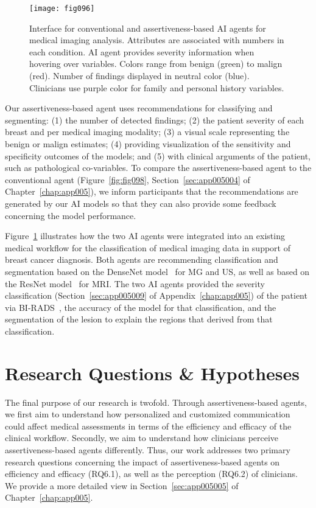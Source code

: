 \begin{figure}[htpb]
\centering
\texttt{[image: fig096]}
\caption[]{Interface for conventional and assertiveness-based AI agents for medical imaging analysis. Attributes are associated with numbers in each condition. AI agent provides severity information when hovering over variables. Colors range from benign (green) to malign (red). Number of findings displayed in neutral color (blue). Clinicians use purple color for family and personal history variables.}
\label{fig:fig096}
\end{figure}

Our assertiveness-based agent uses recommendations for classifying and segmenting:
(1) the number of detected findings;
(2) the patient severity of each breast and per medical imaging modality;
(3) a visual scale representing the benign or malign estimates;
(4) providing visualization of the sensitivity and specificity outcomes of the models; and
(5) with clinical arguments of the patient, such as pathological co-variables.
To compare the assertiveness-based agent to the conventional agent \textcolor{revised}{(Figure~\ref{fig:fig098}, Section~\ref{sec:app005004} of Chapter~\ref{chap:app005})}, we inform participants that the recommendations are generated by our \ac{AI} models so that they can also provide some feedback concerning the model performance.

Figure~\ref{fig:fig096} illustrates how the two \ac{AI} agents were integrated into an existing medical workflow for the classification of medical imaging data in support of breast cancer diagnosis.
Both agents are recommending classification and segmentation based on the DenseNet model~\cite{8721151} for \ac{MG} and \ac{US}, as well as based on the ResNet model~\cite{10.1145/3544548.3580682} for \ac{MRI}.
The two \ac{AI} agents provided the severity classification (Section~\ref{sec:app005009} of Appendix~\ref{chap:app005}) of the patient via \ac{BI-RADS}~\cite{SPAK2017179}, the accuracy of the model for that classification, and the segmentation of the lesion to explain the regions that derived from that classification.

\section{Research Questions \& Hypotheses}
\label{sec:chap006004}

The final purpose of our research is twofold.
Through assertiveness-based agents, we first aim to understand how personalized and customized communication could affect medical assessments in terms of the efficiency and efficacy of the clinical workflow.
Secondly, we aim to understand how clinicians perceive assertiveness-based agents differently.
Thus, our work addresses two primary research questions concerning the impact of assertiveness-based agents on efficiency and efficacy (RQ6.1), as well as the perception (RQ6.2) of clinicians.
We provide a more detailed view in Section~\ref{sec:app005005} of Chapter~\ref{chap:app005}.

